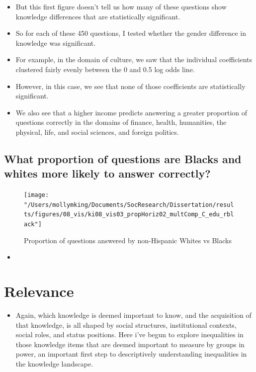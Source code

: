 \documentclass[]{article}
\begin{document}
\begin{itemize}
  \item{But this first figure doesn't tell us how many of these questions show knowledge differences that are statistically significant.}
  \item{So for each of these 450 questions, I tested whether the gender difference in knowledge was significant.}
  \item{For example, in the domain of culture, we saw that the individual coefficients clustered fairly evenly between the 0 and 0.5 log odds line.}
  \item{However, in this case, we see that none of those coefficients are statistically significant.}
  \vspace{5mm}
  \item{We also see that a higher income predicts answering a greater proportion of questions correctly in the domains of finance, health, humanities, the physical, life, and social sciences, and foreign politics.}
\end{itemize}

\newpage

\subsection{What proportion of questions are Blacks and whites more likely to answer correctly?}

\begin{figure}[ht]
    \begin{center}
      \texttt{[image: "/Users/mollymking/Documents/SocResearch/Dissertation/results/figures/08\_vis/ki08\_vis03\_propHoriz02\_multComp\_C\_edu\_rblack"]}
      \caption{Proportion of questions answered by non-Hispanic Whites vs Blacks}
    \end{center}
\end{figure}

\begin{itemize}
  \item{}
\end{itemize}


\section{Relevance}
\begin{itemize}
  \item{Again, which knowledge is deemed important to know, and the acquisition of that knowledge, is all shaped by social structures, institutional contexts, social roles, and status positions. Here i've begun to explore inequalities in those knowledge items that are deemed important to measure by groups in power, an important first step to descriptively understanding inequalities in the knowledge landscape.}
\end{itemize}
\end{document}
